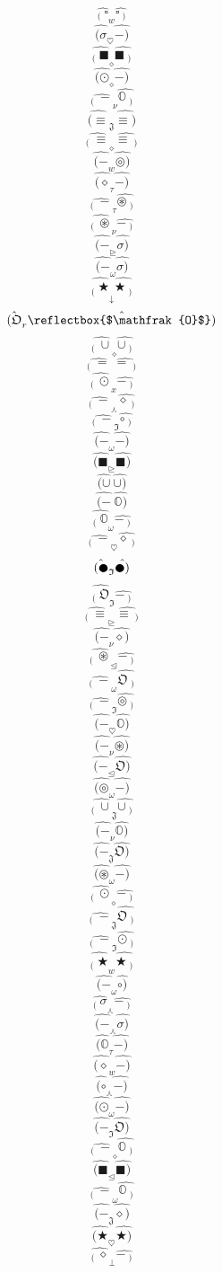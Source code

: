 \documentclass[12pt]{article}
\begin{document}
\begin{multicols}{5}
$$\hat{_( \ \square} _w \hat{\square\ _)}$$
$$\hat{(\sigma} _\heartsuit \hat{-)}$$
$$\hat{_( \ \blacksquare} _\diamond \hat{\blacksquare\ _)}$$
$$\hat{(\odot} _\diamond \hat{-)}$$
$$\hat{_( \ -} _\nu \hat{\mathbb{O}\ _)}$$
$$\hat{(\equiv} _\mathfrak{J} \hat{\equiv)}$$
$$\hat{_( \ \equiv} _\diamond \hat{\equiv\ _)}$$
$$\hat{(-} _w \hat{\circledcirc)}$$
$$\hat{(\diamond} _\tau \hat{-)}$$
$$\hat{_( \ -} _\tau \hat{\circledast\ _)}$$
$$\hat{_( \ \circledast} _\nu \hat{-\ _)}$$
$$\hat{(-} _\trianglerighteq \hat{\sigma)}$$
$$\hat{(-} _\omega \hat{\sigma)}$$
$$\hat{_( \ \bigstar} _\downarrow \hat{\bigstar\ _)}$$
$$\hat{(\mathfrak{O}} _r \hat{\reflectbox{$\mathfrak{O}$})}$$
$$\hat{_( \ \cup} _\diamond \hat{\cup\ _)}$$
$$\hat{_( \ =} \  \hat{=\ _)}$$
$$\hat{_( \ \odot} _x \hat{-\ _)}$$
$$\hat{_( \ -} _\curlywedge \hat{\diamond\ _)}$$
$$\hat{_( \ -} _\mathfrak{I} \hat{\circ\ _)}$$
$$\hat{(-} _\omega \hat{-)}$$
$$\hat{(\blacksquare} _\trianglerighteq \hat{\blacksquare)}$$
$$\hat{(\cup} \  \hat{\cup)}$$
$$\hat{(-} \  \hat{\mathbb{O})}$$
$$\hat{_( \ \mathbb{O}} _\omega \hat{-\ _)}$$
$$\hat{_( \ -} _\heartsuit \hat{\diamond\ _)}$$
$$\hat{(\newmoon} _\mathfrak{I} \hat{\newmoon)}$$
$$\hat{_( \ \mathfrak{O}} _\mathfrak{I} \hat{-\ _)}$$
$$\hat{_( \ \equiv} _\trianglerighteq \hat{\equiv\ _)}$$
$$\hat{(-} _\nu \hat{\diamond)}$$
$$\hat{_( \ \circledast} _\trianglelefteq \hat{-\ _)}$$
$$\hat{_( \ -} _\omega \hat{\mathfrak{O}\ _)}$$
$$\hat{_( \ -} _\mathfrak{I} \hat{\circledcirc\ _)}$$
$$\hat{(-} _\heartsuit \hat{\mathbb{O})}$$
$$\hat{(-} _\nu \hat{\circledast)}$$
$$\hat{(-} _\trianglelefteq \hat{\mathfrak{O})}$$
$$\hat{(\circledcirc} _\omega \hat{-)}$$
$$\hat{_( \ \cup} _\mathfrak{J} \hat{\cup\ _)}$$
$$\hat{(-} _\nu \hat{\mathbb{O})}$$
$$\hat{(-} _\mathfrak{J} \hat{\mathfrak{O})}$$
$$\hat{(\circledast} _\omega \hat{-)}$$
$$\hat{_( \ \odot} _\diamond \hat{-\ _)}$$
$$\hat{_( \ -} _\mathfrak{J} \hat{\mathfrak{O}\ _)}$$
$$\hat{_( \ -} _\mathfrak{I} \hat{\odot\ _)}$$
$$\hat{_( \ \bigstar} _w \hat{\bigstar\ _)}$$
$$\hat{(-} _\omega \hat{\circ)}$$
$$\hat{_( \ \sigma} _\curlywedge \hat{-\ _)}$$
$$\hat{(-} _\curlywedge \hat{\sigma)}$$
$$\hat{(\mathbb{O}} _\tau \hat{-)}$$
$$\hat{(\diamond} _w \hat{-)}$$
$$\hat{(\circ} _\curlywedge \hat{-)}$$
$$\hat{(\odot} _\omega \hat{-)}$$
$$\hat{(-} _\mathfrak{I} \hat{\mathfrak{O})}$$
$$\hat{_( \ -} _\diamond \hat{\mathbb{O}\ _)}$$
$$\hat{(\blacksquare} _\trianglelefteq \hat{\blacksquare)}$$
$$\hat{_( \ -} _\omega \hat{\mathbb{O}\ _)}$$
$$\hat{(-} _\mathfrak{J} \hat{\diamond)}$$
$$\hat{(\bigstar} _\heartsuit \hat{\bigstar)}$$
$$\hat{_( \ \diamond} _\bot \hat{-\ _)}$$

\end{multicols}
\end{document}
